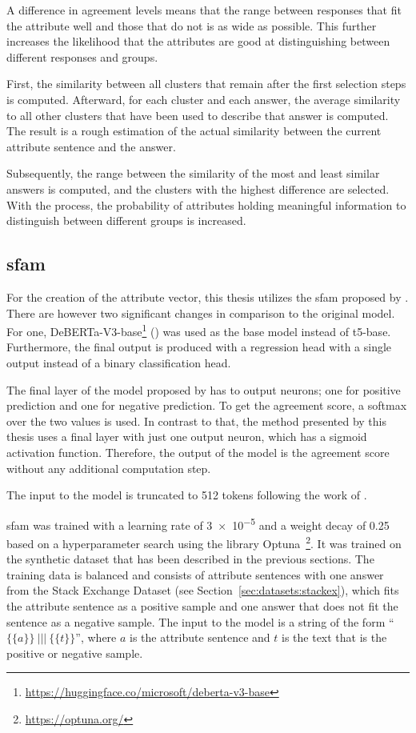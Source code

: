 A difference in agreement levels means that the range between responses that fit the attribute well and those that do not is as wide as possible. This further increases the likelihood that the attributes are good at distinguishing between different responses and groups.

First, the similarity between all clusters that remain after the first selection steps is computed. Afterward, for each cluster and each answer, the average similarity to all other clusters that have been used to describe that answer is computed. The result is a rough estimation of the actual similarity between the current attribute sentence and the answer.

Subsequently, the range between the similarity of the most and least similar answers is computed, and the clusters with the highest difference are selected. With the process, the probability of attributes holding meaningful information to distinguish between different groups is increased.

\subsection{\acf{sfam}}
\label{sec:experiments:setup:sfam}
For the creation of the attribute vector, this thesis utilizes the \acl{sfam} proposed by \citet{patelLearningInterpretableStyle2023}. There are however two significant changes in comparison to the original model. For one, DeBERTa-V3-base\footnote{\url{https://huggingface.co/microsoft/deberta-v3-base}} (\cite{he2021deberta}) was used as the base model instead of t5-base. Furthermore, the final output is produced with a regression head with a single output instead of a binary classification head.

The final layer of the model proposed by \citet{patelLearningInterpretableStyle2023} has to output neurons; one for positive prediction and one for negative prediction. To get the agreement score, a softmax over the two values is used. In contrast to that, the method presented by this thesis uses a final layer with just one output neuron, which has a sigmoid activation function. Therefore, the output of the model is the agreement score without any additional computation step.

The input to the model is truncated to 512 tokens following the work of \citet{patelLearningInterpretableStyle2023}.

\acs{sfam} was trained with a learning rate of \num{3e-5} and a weight decay of \num{0.25} based on a hyperparameter search using the library Optuna~\footnote{\url{https://optuna.org/}}. It was trained on the synthetic dataset that has been described in the previous sections. The training data is balanced and consists of attribute sentences with one answer from the Stack Exchange Dataset (see Section~\ref{sec:datasets:stackex}), which fits the attribute sentence as a positive sample and one answer that does not fit the sentence as a negative sample. The input to the model is a string of the form \enquote{\(\{\{a\}\}~|||~\{\{t\}\}\)}, where \(a\) is the attribute sentence and \(t\) is the text that is the positive or negative sample.

